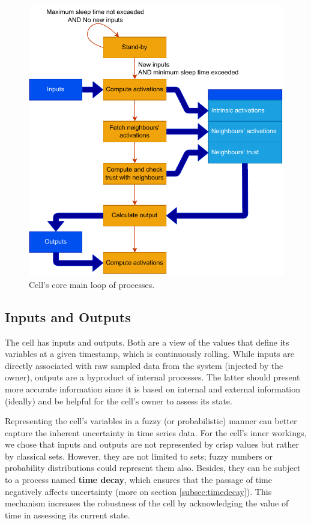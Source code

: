 \begin{figure}[h!]
    \centering
    \includegraphics[width=12cm]{figures/chapter4/cell/processes.pdf}
    \caption{Cell's core main loop of processes.}
    \label{fig:cellprocesses}
\end{figure}


\subsection{Inputs and Outputs}

The cell has inputs and outputs. Both are a view of the values that define its variables at a given timestamp, which is continuously rolling. While inputs are directly associated with raw sampled data from the system (injected by the owner), outputs are a byproduct of internal processes. The latter should present more accurate information since it is based on internal and external information (ideally) and be helpful for the cell's owner to assess its state.

Representing the cell's variables in a fuzzy (or probabilistic) manner can better capture the inherent uncertainty in time series data. For the cell's inner workings, we chose that inputs and outputs are not represented by crisp values but rather by classical sets. However, they are not limited to sets; fuzzy numbers or probability distributions could represent them also. Besides, they can be subject to a process named \textbf{time decay}, which ensures that the passage of time negatively affects uncertainty (more on section \ref{subsec:timedecay}). This mechanism increases the robustness of the cell by acknowledging the value of time in assessing its current state.

